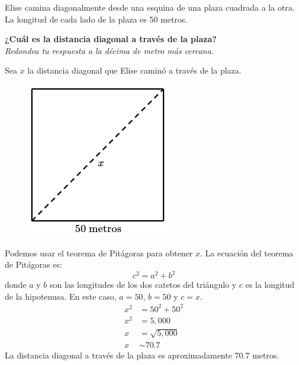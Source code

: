 Elise camina diagonalmente desde una esquina de una plaza cuadrada a la otra.
La longitud de cada lado de la plaza es 50 metros.

\textbf{¿Cuál es la distancia diagonal a través de la plaza?}\\
\textit{Redondea tu respuesta a la décima de metro más cercana.}


\begin{solutionbox}{13cm}
    Sea $x$ la distancia diagonal que Elise caminó a través de la plaza.
    \begin{figure}[H]
        \centering
        \includegraphics[width=0.2\linewidth]{../images/proverb_pitagoras_11.png}
        \caption{}
        \label{fig:proverb_pitagoras_11}
    \end{figure}
    Podemos usar el teorema de Pitágoras para obtener $x$.
    La ecuación del teorema de Pitágoras es:
    \[c^2=a^2+b^2\]
    donde $a$ y $b$ son las longitudes de los dos catetos del triángulo y $c$ es la longitud de la hipotenusa.
    En este caso, $a=50$, $b=50$ y $c=x$.
    \begin{align*}
        x^2 & =50^2+50^2    \\
        x^2 & =5,000        \\
        x   & =\sqrt{5,000} \\
        x   & \sim 70.7
    \end{align*}
    La distancia diagonal a través de la plaza es aproximadamente 70.7 metros.
\end{solutionbox}